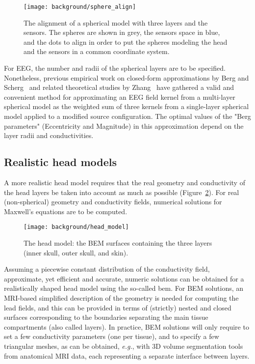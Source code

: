 \begin{figure}
\centering
	\texttt{[image: background/sphere\_align]}
    \caption{The alignment of a spherical model with three layers and the sensors. The spheres are shown in grey, the sensors space in blue, and the dots to align in order to put the spheres modeling the head and the sensors in a common coordinate system.}
	\label{fig:sphere_align}
\end{figure}

For EEG, the number and radii of the spherical layers are to be specified. Nonetheless, previous empirical work on closed-form approximations by Berg and Scherg~\cite{berg1994fast} and related theoretical studies by Zhang~\cite{zhang1995fast} have gathered a valid and convenient method for approximating an EEG field kernel from a multi-layer spherical model as the weighted sum of three kernels from a single-layer spherical model applied to a modified source configuration. The optimal values of the "Berg parameters" (Eccentricity and Magnitude) in this approximation depend on the layer radii and conductivities.

\subsection*{Realistic head models}
A more realistic head model requires that the real geometry and conductivity of the head layers be taken into account as much as possible (Figure~\ref{fig:head_model}). For real (non-spherical) geometry and conductivity fields, numerical solutions for Maxwell's equations are to be computed.\\
\begin{figure}
\centering
	\texttt{[image: background/head\_model]}
    \caption{The head model: the BEM surfaces containing the three layers (inner skull, outer skull, and skin).}
	\label{fig:head_model}
\end{figure}
Assuming a piecewise constant distribution of the conductivity field, approximate, yet efficient and accurate, numeric solutions can be obtained for a realistically shaped head model using the so-called \ac{bem}. For BEM solutions, an MRI-based simplified description of the geometry is needed for computing the lead fields, and this can be provided in terms of (strictly) nested and closed surfaces corresponding to the boundaries separating the main tissue compartments (also called layers).
In practice, BEM solutions will only require to set a few conductivity parameters (one per tissue), and to specify a few triangular meshes, as can be obtained, \textit{e.g.}, with 3D volume segmentation tools from anatomical MRI data, each representing a separate interface between layers. \\

